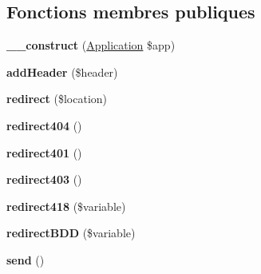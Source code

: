 \subsection*{Fonctions membres publiques}
\begin{DoxyCompactItemize}
\item 
\hypertarget{class_library_1_1_h_t_t_p_response_a2649bea9628906af84eedc23f383af8e}{{\bfseries \+\_\+\+\_\+construct} (\hyperlink{class_library_1_1_application}{Application} \$app)}\label{class_library_1_1_h_t_t_p_response_a2649bea9628906af84eedc23f383af8e}

\item 
\hypertarget{class_library_1_1_h_t_t_p_response_a27b347822dc0556d25d6e28eface1160}{{\bfseries add\+Header} (\$header)}\label{class_library_1_1_h_t_t_p_response_a27b347822dc0556d25d6e28eface1160}

\item 
\hypertarget{class_library_1_1_h_t_t_p_response_aa250e88258e8c27e9ae2cb36dc15ae2b}{{\bfseries redirect} (\$location)}\label{class_library_1_1_h_t_t_p_response_aa250e88258e8c27e9ae2cb36dc15ae2b}

\item 
\hypertarget{class_library_1_1_h_t_t_p_response_affbf4ae875b33d2c0989a7fd14bb00d6}{{\bfseries redirect404} ()}\label{class_library_1_1_h_t_t_p_response_affbf4ae875b33d2c0989a7fd14bb00d6}

\item 
\hypertarget{class_library_1_1_h_t_t_p_response_a7e135ba034068cc1394dd3becb5299bb}{{\bfseries redirect401} ()}\label{class_library_1_1_h_t_t_p_response_a7e135ba034068cc1394dd3becb5299bb}

\item 
\hypertarget{class_library_1_1_h_t_t_p_response_a05873f2f7a63c842582d57f8ed925908}{{\bfseries redirect403} ()}\label{class_library_1_1_h_t_t_p_response_a05873f2f7a63c842582d57f8ed925908}

\item 
\hypertarget{class_library_1_1_h_t_t_p_response_a54077d593d73f459c896b4bb37425a2d}{{\bfseries redirect418} (\$variable)}\label{class_library_1_1_h_t_t_p_response_a54077d593d73f459c896b4bb37425a2d}

\item 
\hypertarget{class_library_1_1_h_t_t_p_response_a7564e550a840f2d56a55302b7c425983}{{\bfseries redirect\+B\+D\+D} (\$variable)}\label{class_library_1_1_h_t_t_p_response_a7564e550a840f2d56a55302b7c425983}

\item 
\hypertarget{class_library_1_1_h_t_t_p_response_a12bcef5130168b80d3d52dc82213f19a}{{\bfseries send} ()}\label{class_library_1_1_h_t_t_p_response_a12bcef5130168b80d3d52dc82213f19a}


\end{DoxyCompactItemize}

